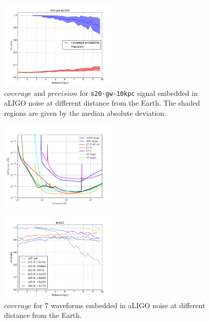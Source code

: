\begin{figure}
  \centering
  \includegraphics[width=0.5\textwidth]{plots/s20-gw_covpbb_prec_aLIGO}
 \caption{$coverage$ and $precision$ for {\tt s20-gw-10kpc} signal embedded in aLIGO noise at different distance from the Earth. The shaded regions are given by the median absolute deviation.} \label{fig:s20results}
\end{figure}


\begin{figure}
 \centering
 \includegraphics[width=0.5\textwidth]{plots/spectrum}
 \caption{} \label{fig:spectrum}
\end{figure}

\begin{figure}
  \centering
  \includegraphics[width=0.5\textwidth]{plots/covppb_all_aLIGO}
 \caption{$coverage$ for 7 waveforms embedded in aLIGO noise at different distance from the Earth. } \label{fig:aLIGOall}
\end{figure}


